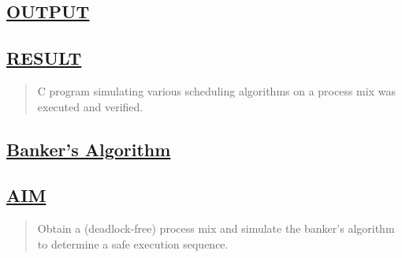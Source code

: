 \documentclass[a4paper, 12pt]{article}
\begin{document}
\newpage
\subsection*{\underline{OUTPUT}}

\begin{figure}[H] 
    \centering
\end{figure}


\subsection*{\underline{RESULT}}
\begin{quote}
C program simulating various scheduling algorithms on a process mix was executed and verified.
\end{quote}

\newpage
\begin{center}
\section*{\LARGE \textbf{\underline{Banker's Algorithm}}} 
\end{center}

\subsection*{\underline{AIM}}
\begin{quote}
Obtain a (deadlock-free) process mix and simulate the banker’s algorithm to determine
a safe execution sequence.
\end{quote}
\end{document}
